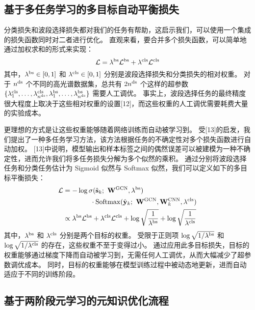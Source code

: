 \subsection{基于多任务学习的多目标自动平衡损失}
分类损失和波段选择损失都对我们的任务有帮助，这启示我们，可以使用一个集成的损失函数同时对二者进行优化。
直观来看，要合并多个损失函数，可以简单地通过加权求和的形式来实现：
\begin{equation}
    \mathcal{L} = \lambda^\text{bs} \mathcal{L}^{\text{bs}} + \lambda^\text{cls} \mathcal{L}^{\text{cls}}
    \label{eqn:loss}
\end{equation}
其中，$\lambda^\text{bs} \in [0,1]$ 和 $\lambda^\text{cls} \in [0,1]$ 分别是波段选择损失和分类损失的相对权重。
对于 ${n^\text{ds}}$ 个不同的高光谱数据集，总共有 $2{n^\text{ds}}$ 个这样的超参数 $\{ \lambda_1^\text{cls}, \dots, \lambda_{n^\text{ds}}^\text{cls}, \lambda_1^\text{bs}, \dots, \lambda_{n^\text{ds}}^\text{bs} \}$ 需要人工调优。
事实上，波段选择任务的最终精度很大程度上取决于这些相对权重的设置[12]，而这些权重的人工调优需要耗费大量的实验成本。
\par
更理想的方式是让这些权重能够随着网络训练而自动被学习到。
受[13]的启发，我们提出了一种多任务学习方法，该方法根据任务的不确定性对多个损失函数进行自动加权。
[13]中说明，模型输出和样本标签之间的偶然误差可以被建模为一种不确定性，进而允许我们将多任务损失分解为多个似然的乘积。
通过分别将波段选择任务和分类任务估计为 Sigmoid 似然与 Softmax 似然，我们可以定义如下的多目标平衡损失：
\begin{equation}
\begin{split}
\mathcal{L}
&= -\log \sigma(\hat{\mathbf{s}}_k;\ \mathbf{W}^\text{GCN}, \lambda^\text{bs}) \nonumber\\
&\qquad\qquad \cdot \operatorname{Softmax}(\hat{\mathbf{y}}_k;\ \mathbf{W}^\text{GCN}, \mathbf{W}_k^\text{CNN}, \lambda^\text{cls}) \nonumber\\
&\propto \lambda^\text{bs} \mathcal{L}^\text{bs} + \lambda^\text{cls} \mathcal{L}^\text{cls} + \log\sqrt{\frac{1}{\lambda^\text{bs}}} + \log\sqrt{\frac{1}{\lambda^\text{cls}}} 
\end{split}
\label{eqn:loss-uncertainty}
\end{equation}
其中，$\lambda^\text{bs}$ 和 $\lambda^\text{cls}$ 分别是两个目标的权重。
受限于正则项 $\log\sqrt{1 / {\lambda^\text{bs}}}$ 和 $\log\sqrt{1 / {\lambda^\text{cls}}}$ 的存在，这些权重不至于变得过小。
通过应用此多目标损失，目标的权重能够通过梯度下降而自动被学习到，无需任何人工调优，从而大幅减少了超参数调优成本。
同时，目标的权重能够在模型训练过程中被动态地更新，进而自动适应于不同的训练阶段。
\subsection{基于两阶段元学习的元知识优化流程}

